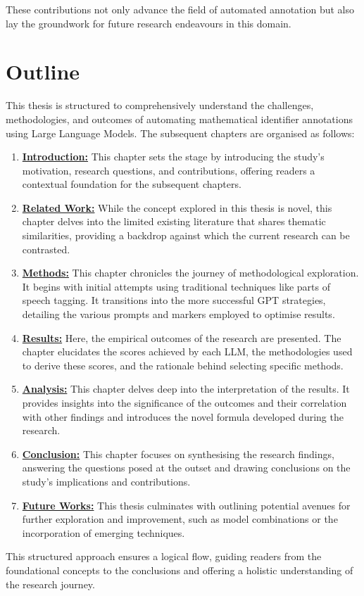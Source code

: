 These contributions not only advance the field of automated annotation but also lay the groundwork for future research endeavours in this domain.

\section{Outline}

This thesis is structured to comprehensively understand the challenges, methodologies, and outcomes of automating mathematical identifier annotations using Large Language Models. The subsequent chapters are organised as follows:

\begin{enumerate}
    \item \textbf{\hyperref[chapter:introduction]{Introduction:}}  This chapter sets the stage by introducing the study's motivation, research questions, and contributions, offering readers a contextual foundation for the subsequent chapters.
    
    \item \textbf{\hyperref[chapter:related_work]{Related Work:}} While the concept explored in this thesis is novel, this chapter delves into the limited existing literature that shares thematic similarities, providing a backdrop against which the current research can be contrasted.
    
    \item \textbf{\hyperref[chapter:methods]{Methods:}} This chapter chronicles the journey of methodological exploration. It begins with initial attempts using traditional techniques like parts of speech tagging. It transitions into the more successful GPT strategies, detailing the various prompts and markers employed to optimise results.
    
    \item \textbf{\hyperref[chapter:results]{Results:}} Here, the empirical outcomes of the research are presented. The chapter elucidates the scores achieved by each LLM, the methodologies used to derive these scores, and the rationale behind selecting specific methods.
    
    \item \textbf{\hyperref[chapter:analysis]{Analysis:}} This chapter delves deep into the interpretation of the results. It provides insights into the significance of the outcomes and their correlation with other findings and introduces the novel formula developed during the research.
    
    \item \textbf{\hyperref[chapter:conclusion]{Conclusion:}} This chapter focuses on synthesising the research findings, answering the questions posed at the outset and drawing conclusions on the study's implications and contributions.
    
    \item \textbf{\hyperref[chapter:future_works]{Future Works:}} This thesis culminates with outlining potential avenues for further exploration and improvement, such as model combinations or the incorporation of emerging techniques.
    
    
\end{enumerate}

This structured approach ensures a logical flow, guiding readers from the foundational concepts to the conclusions and offering a holistic understanding of the research journey.